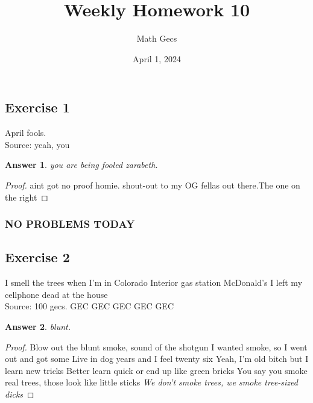 \documentclass[12pt]{article}
\title{Weekly Homework 10}
\author{Math Gecs}
\date{April 1, 2024}
\newtheorem*{answer*}{Answer}
\begin{document}
\maketitle

\subsection*{Exercise 1}
April fools. \\

Source: yeah, you\\

\begin{answer*}
you are being fooled zarabeth.
\end{answer*}

\begin{proof}
aint got no proof homie. shout-out to my OG fellas out there.The one on the right
\end{proof}

\vspace{0.4in}



\subsubsection*{NO PROBLEMS TODAY}
\vspace{0.5in}

\subsection*{Exercise 2}
I smell the trees when I'm in Colorado
Interior gas station McDonald's
I left my cellphone dead at the house\\

Source: 100 gecs. GEC GEC GEC GEC GEC\\

\begin{answer*}
blunt.
\end{answer*}

\begin{proof}
Blow out the blunt smoke, sound of the shotgun
I wanted smoke, so I went out and got some
Live in dog years and I feel twenty six
Yeah, I'm old bitch but I learn new tricks
Better learn quick or end up like green bricks
You say you smoke real trees, those look like little sticks
\textit{We don't smoke trees, we smoke tree-sized dicks}
\end{proof}
\end{document}
